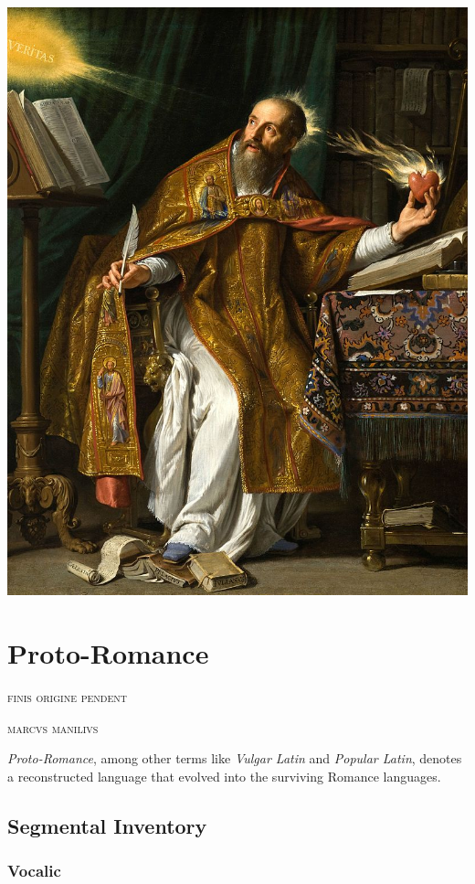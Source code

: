 \documentclass{report}[12pt]
\begin{document}
\includegraphics[scale=0.5]{augustine.jpg}
\thispagestyle{empty}

\pagebreak

\chapter{Proto-Romance}

\epigraph{\textsc{finis origine pendent}}{\textsc{marcvs manilivs}}

\emph{Proto-Romance}, among other terms like \emph{Vulgar Latin} and \emph{Popular Latin}, denotes a reconstructed language that evolved into the surviving Romance languages. 

\section{Segmental Inventory}

\subsection{Vocalic}
\end{document}

